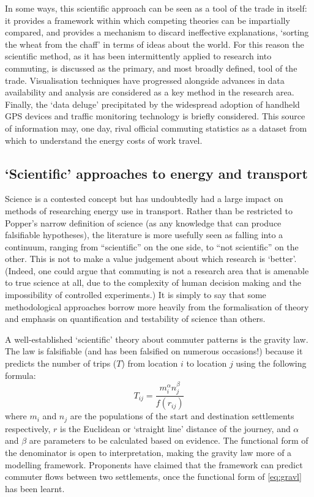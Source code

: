 \documentclass[a4paper, 11pt, twoside]{Thesis}
\begin{document}
In some ways, this scientific approach
can be seen as a tool of the trade in itself: it provides a framework within
which competing theories can be impartially compared, and provides a mechanism
to discard ineffective explanations, `sorting the wheat from the chaff' in terms of
ideas about the world. For this reason the scientific method, as it has been
intermittently applied to research into commuting, is discussed as the primary,
and most broadly defined, tool of the trade.
Visualisation techniques have progressed alongside advances in data availability
and analysis are considered as a key method in the research area.
Finally, the `data deluge' precipitated by the
widespread adoption of handheld GPS devices and traffic monitoring technology
is briefly considered. This source of information may, one day,
rival official commuting statistics as a dataset from which to understand the
energy costs of work travel.

\subsection{`Scientific' approaches to energy and transport}
\label{sscientific}
Science is a contested concept but has undoubtedly had a large impact on
methods of researching energy use in transport. Rather than be restricted
to Popper's narrow definition of science (as any knowledge that can produce
falsifiable hypotheses), the literature is more usefully seen as falling into a continuum,
ranging from ``scientific'' on the one side, to ``not scientific'' on the
other. This is not to make a value judgement about which research is `better'.
(Indeed, one could argue that commuting is not a research area
that is amenable to true science at all, due to the complexity of human decision
making and the impossibility of controlled experiments.) It is simply
to say that some methodological approaches borrow more heavily from the
formalisation of theory and emphasis on quantification and testability of
science than others. 

A well-established `scientific' theory about commuter patterns is the gravity
law. The law is falsifiable (and has been falsified on numerous occasions!)
because it predicts the number of trips ($T$) from location $i$ to location $j$
using the following formula:
\begin{equation}
 T_{ij} = \frac{m_{i}^{\alpha} n_{j} ^{\beta}} {f(r_{ij})}
\label{eq:gravl}
\end{equation}
where  $m_i$ and $n_j$ are the populations of the start and
destination settlements respectively, $r$ is the Euclidean or `straight line'
distance of the
journey, and $\alpha$ and $\beta$ are parameters to be calculated based on
evidence. The functional form of the denominator is open to interpretation,
making the gravity law more of a modelling framework. Proponents have
claimed that the
framework can predict commuter flows between two settlements, once the
functional form of \cref{eq:gravl} has been learnt.
\end{document}
